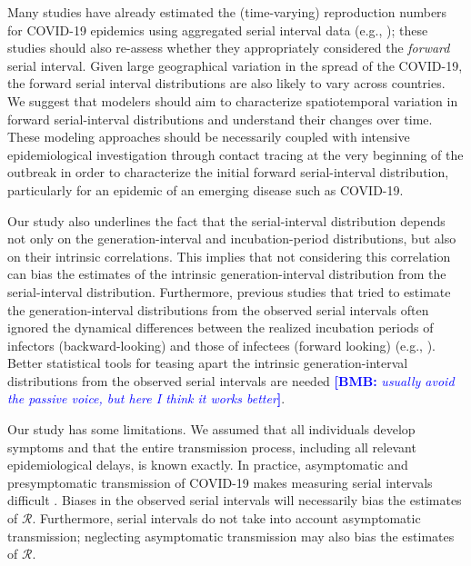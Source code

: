 \documentclass[12pt]{article}
\newcommand{\comment}{\showcomment}
\newcommand{\showcomment}[3]{\textcolor{#1}{\textbf{[#2: }\textsl{#3}\textbf{]}}}
\newcommand{\bmb}[1]{\comment{blue}{BMB}{#1}}
\newcommand{\RR}{\ensuremath{{\mathcal R}}\xspace}
\begin{document}
Many studies have already estimated the (time-varying) reproduction numbers for COVID-19 epidemics using aggregated serial interval data (e.g., \cite{tempvar,du2020serial,pan2020jama,zhang2020evolving});
these studies should also re-assess whether they appropriately considered the \emph{forward} serial interval.
Given large geographical variation in the spread of the COVID-19, the forward serial interval distributions are also likely to vary across countries.
We suggest that modelers should aim to characterize spatiotemporal variation in forward serial-interval distributions and understand their changes over time.
These modeling approaches should be necessarily coupled with intensive
epidemiological investigation through contact tracing at the very
beginning of the outbreak in order to characterize the initial forward
serial-interval distribution, particularly for an epidemic of an
emerging disease such as COVID-19.

Our study also underlines the fact that the serial-interval distribution depends not only on the generation-interval and incubation-period distributions, but also on their intrinsic correlations.
This implies that not considering this correlation can bias the estimates of the intrinsic generation-interval distribution from the serial-interval distribution.
Furthermore, previous studies that tried to estimate the generation-interval distributions from the observed serial intervals often ignored the dynamical differences between the realized incubation periods of infectors (backward-looking) and those of infectees (forward looking) (e.g., \cite{klinkenberg2011correlation, ganyani2020estimating}).
Better statistical tools for teasing apart the intrinsic generation-interval distributions from the observed serial intervals are needed \bmb{usually avoid the passive voice, but here I think it works better}.

Our study has some limitations.
We assumed that all individuals develop symptoms and that the entire transmission process, including all relevant epidemiological delays, is known exactly.
In practice, asymptomatic and presymptomatic transmission of COVID-19 makes measuring serial intervals difficult \citep{bai2020presumed,he2020temporal,wei2020presymptomatic}.
Biases in the observed serial intervals will necessarily bias the estimates of \RR. 
Furthermore, serial intervals do not take into account asymptomatic transmission; 
neglecting asymptomatic transmission may also bias the estimates of \RR \citep{park2020time}.
\end{document}
